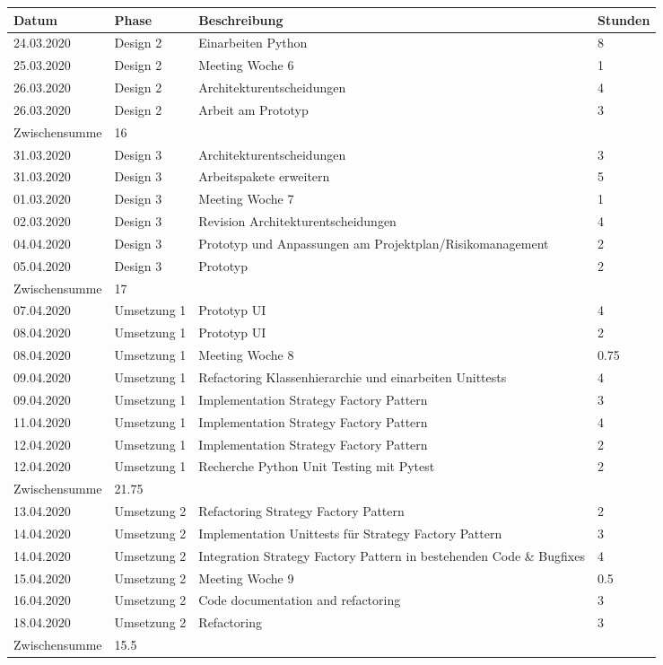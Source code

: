 \documentclass[
	ngerman,
	toc=listof, %
	toc=bibliography, %
	footnotes=multiple, %
	parskip=half, %
	numbers=noendperiod %
]{scrartcl}
\begin{document}
	\newpage

	\begin{tabularx}{\textwidth}{llXl}
		\toprule
		Datum & Phase & Beschreibung & Stunden \\
		\midrule
		24.03.2020 & Design 2 & Einarbeiten Python & 8 \\
		25.03.2020 & Design 2 & Meeting Woche 6 & 1 \\
		26.03.2020 & Design 2 & Architekturentscheidungen & 4 \\
		26.03.2020 & Design 2 & Arbeit am Prototyp & 3 \\
		\midrule
		Zwischensumme & 16 & & \\
		\midrule
		31.03.2020 & Design 3 & Architekturentscheidungen & 3 \\
		31.03.2020 & Design 3 & Arbeitspakete erweitern &  5 \\
		01.03.2020 & Design 3 & Meeting Woche 7 & 1 \\
		02.03.2020 & Design 3 & Revision Architekturentscheidungen & 4 \\
		04.04.2020 & Design 3 & Prototyp und Anpassungen am Projektplan/Risikomanagement & 2 \\ 
		05.04.2020 & Design 3 & Prototyp & 2 \\
		\midrule
		Zwischensumme & 17 & & \\
		\midrule
		07.04.2020 & Umsetzung 1 & Prototyp UI & 4 \\
		08.04.2020 & Umsetzung 1 & Prototyp UI & 2 \\
		08.04.2020 & Umsetzung 1 & Meeting Woche 8 & 0.75 \\
		09.04.2020 & Umsetzung 1 & Refactoring Klassenhierarchie und einarbeiten Unittests & 4 \\
		09.04.2020 & Umsetzung 1 & Implementation Strategy Factory Pattern & 3 \\
		11.04.2020 & Umsetzung 1 & Implementation Strategy Factory Pattern & 4 \\
		12.04.2020 & Umsetzung 1 & Implementation Strategy Factory Pattern & 2 \\
		12.04.2020 & Umsetzung 1 & Recherche Python Unit Testing mit Pytest & 2 \\
		\midrule
		Zwischensumme & 21.75 & & \\
		\midrule
		13.04.2020 & Umsetzung 2 & Refactoring Strategy Factory Pattern & 2 \\
		14.04.2020 & Umsetzung 2 & Implementation Unittests für Strategy Factory Pattern & 3 \\
		14.04.2020 & Umsetzung 2 & Integration Strategy Factory Pattern in bestehenden Code \& Bugfixes & 4 \\
		15.04.2020 & Umsetzung 2 & Meeting Woche 9 & 0.5 \\
		16.04.2020 & Umsetzung 2 & Code documentation and refactoring & 3 \\
		18.04.2020 & Umsetzung 2 & Refactoring & 3 \\
		\midrule
		Zwischensumme & 15.5 & & \\
		\bottomrule
	\end{tabularx}
	
\end{document}

